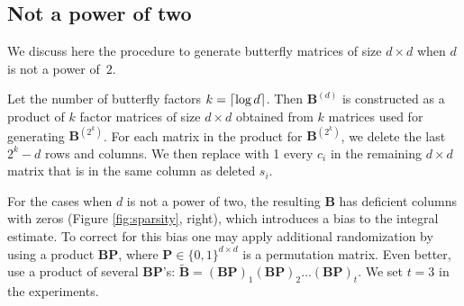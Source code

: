\subsection{Not a power of two}
\label{appendix:butterflies_not_power_of_two}
We discuss here the procedure to generate butterfly matrices of size $d \times d$ when $d$ is not a power of~$2$.

Let the number of butterfly factors $k = \lceil\log d\rceil$. Then $\mathbf{B}^{(d)}$ is constructed as a product of $k$ factor matrices of size $d \times d$ obtained from $k$ matrices used for generating $\mathbf{B}^{(2^k)}$. For each matrix in the product for $\mathbf{B}^{(2^k)}$, we delete the last $2^k - d$ rows and columns. We then replace with 1 every $c_i$ in the remaining $d \times d$ matrix that is in the same column as deleted $s_i$.

For the cases when $d$ is not a power of two, the resulting $\mathbf{B}$ has deficient columns with zeros (Figure \ref{fig:sparsity}, right), which introduces a bias to the integral estimate. To correct for this bias one may apply additional randomization by using a product $\mathbf{BP}$, where $\mathbf{P} \in \{0,1\}^{d \times d}$ is a permutation matrix. Even better, use a product of several $\mathbf{BP}$'s: $\mathbf{\widetilde{B}} = (\mathbf{BP})_1 (\mathbf{BP})_2 \dots (\mathbf{BP})_t$. We set $t=3$ in the experiments.

